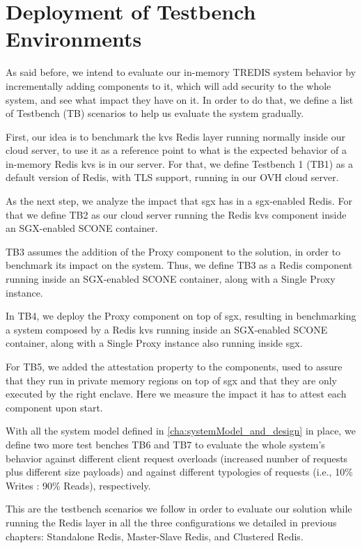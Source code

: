 \section{Deployment of Testbench Environments}
\label{sec:testBenchEnvironments}

As said before, we intend to evaluate our in-memory TREDIS system behavior by incrementally adding components to it, which will add security to the whole system, and see what impact they have on it. In order to do that, we define a list of Testbench (TB) scenarios to help us evaluate the system gradually.

First, our idea is to benchmark the \gls{kvs} Redis layer running normally inside our cloud server, to use it as a reference point to what is the expected behavior of a in-memory Redis \gls{kvs} is in our server. For that, we define Testbench 1 (TB1) as a default version of Redis, with TLS support, running in our OVH cloud server.

As the next step, we analyze the impact that \gls{sgx} has in a \gls{sgx}-enabled Redis. For that we define TB2 as our cloud server running the Redis \gls{kvs} component inside an SGX-enabled SCONE container.

TB3 assumes the addition of the Proxy component to the solution, in order to benchmark its impact on the system. Thus, we define TB3 as a Redis component running inside an SGX-enabled SCONE container, along with a Single Proxy instance.

In TB4, we deploy the Proxy component on top of \gls{sgx}, resulting in benchmarking a system composed by a Redis \gls{kvs} running inside an SGX-enabled SCONE container, along with a Single Proxy instance also running inside \gls{sgx}.

For TB5, we added the attestation property to the components, used to assure that they run in private memory regions on top of \gls{sgx} and that they are only executed by the right enclave. Here we measure the impact it has to attest each component upon start.

With all the system model defined in \ref{cha:systemModel_and_design} in place, we define two more test benches TB6 and TB7 to evaluate the whole system's behavior against different client request overloads (increased number of requests plus different size payloads) and against different typologies of requests (i.e., 10\% Writes : 90\% Reads), respectively.

This are the testbench scenarios we follow in order to evaluate our solution while running the Redis layer in all the three configurations we detailed in previous chapters: Standalone Redis, Master-Slave Redis, and Clustered Redis.


